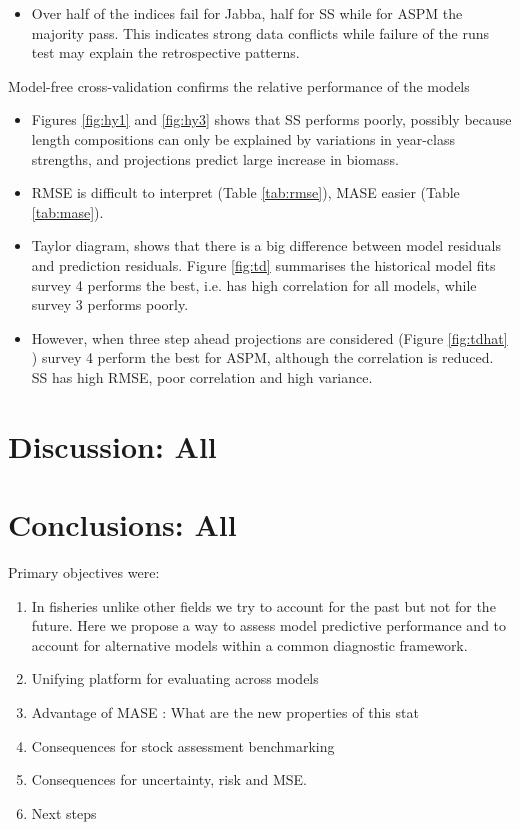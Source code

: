 \documentclass[a4paper]{article}
\begin{document}
\begin{description}
\begin{itemize}
        \item Over half of the indices fail for Jabba, half for SS while for ASPM the majority pass. This indicates strong data conflicts while  failure of the runs test may explain the retrospective patterns.
   \end{itemize}
     \item{Model-free cross-validation} confirms the relative performance of the models
    \begin{itemize}
        \item Figures \ref{fig:hy1} and \ref{fig:hy3} shows that SS performs poorly, possibly because length compositions can only be explained by variations in year-class strengths, and projections predict large increase in biomass.
        \item RMSE is difficult to interpret (Table \ref{tab:rmse}), MASE easier (Table \ref{tab:mase}).
        \item Taylor diagram, shows that there is a big difference between model residuals and prediction residuals. Figure \ref{fig:td} summarises the historical model fits survey 4 performs the best, i.e. has high correlation for all models, while survey 3 performs poorly.
        \item However, when three step ahead projections are considered (Figure \ref{fig:tdhat} ) survey 4 perform the best for ASPM, although the correlation is reduced. SS has high RMSE, poor correlation and high  variance.  
   \end{itemize}
 \end{description}

\section{Discussion: All}


\section{Conclusions: All}

Primary objectives were:
\begin{enumerate}
    \item In fisheries unlike other fields we try to account for the past but not for the future. Here we propose a way to assess model predictive performance and to account for alternative models within a common diagnostic framework.  
    \item Unifying platform for evaluating across models
    \item Advantage of MASE : What are the new properties of this stat
    \item Consequences for stock assessment benchmarking
    \item Consequences for uncertainty, risk and MSE.
    \item Next steps
\end{enumerate}
\end{document}
